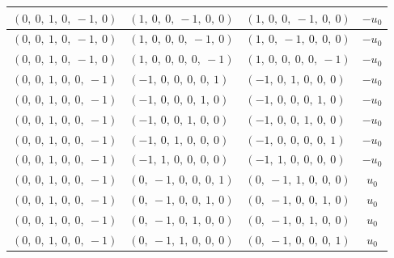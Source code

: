 \documentclass[11pt]{article}
\theoremstyle{definition}
\begin{document}
\begin{longtable}{|l|l|l|c|}
    \hline
    $\left( 0, \  0, \  1, \  0, \  -1, \  0\right)$ & $\left( 1, \  0, \  0, \  -1, \  0, \  0\right)$ & $\left( 1, \  0, \  0, \  -1, \  0, \  0\right)$ & $- u_{0}$ \\
    \hline
    $\left( 0, \  0, \  1, \  0, \  -1, \  0\right)$ & $\left( 1, \  0, \  0, \  0, \  -1, \  0\right)$ & $\left( 1, \  0, \  -1, \  0, \  0, \  0\right)$ & $- u_{0}$ \\
    \hline
    $\left( 0, \  0, \  1, \  0, \  -1, \  0\right)$ & $\left( 1, \  0, \  0, \  0, \  0, \  -1\right)$ & $\left( 1, \  0, \  0, \  0, \  0, \  -1\right)$ & $- u_{0}$ \\
    \hline
    $\left( 0, \  0, \  1, \  0, \  0, \  -1\right)$ & $\left( -1, \  0, \  0, \  0, \  0, \  1\right)$ & $\left( -1, \  0, \  1, \  0, \  0, \  0\right)$ & $- u_{0}$ \\
    \hline
    $\left( 0, \  0, \  1, \  0, \  0, \  -1\right)$ & $\left( -1, \  0, \  0, \  0, \  1, \  0\right)$ & $\left( -1, \  0, \  0, \  0, \  1, \  0\right)$ & $- u_{0}$ \\
    \hline
    $\left( 0, \  0, \  1, \  0, \  0, \  -1\right)$ & $\left( -1, \  0, \  0, \  1, \  0, \  0\right)$ & $\left( -1, \  0, \  0, \  1, \  0, \  0\right)$ & $- u_{0}$ \\
    \hline
    $\left( 0, \  0, \  1, \  0, \  0, \  -1\right)$ & $\left( -1, \  0, \  1, \  0, \  0, \  0\right)$ & $\left( -1, \  0, \  0, \  0, \  0, \  1\right)$ & $- u_{0}$ \\
    \hline
    $\left( 0, \  0, \  1, \  0, \  0, \  -1\right)$ & $\left( -1, \  1, \  0, \  0, \  0, \  0\right)$ & $\left( -1, \  1, \  0, \  0, \  0, \  0\right)$ & $- u_{0}$ \\
    \hline
    $\left( 0, \  0, \  1, \  0, \  0, \  -1\right)$ & $\left( 0, \  -1, \  0, \  0, \  0, \  1\right)$ & $\left( 0, \  -1, \  1, \  0, \  0, \  0\right)$ & $u_{0}$ \\
    \hline
    $\left( 0, \  0, \  1, \  0, \  0, \  -1\right)$ & $\left( 0, \  -1, \  0, \  0, \  1, \  0\right)$ & $\left( 0, \  -1, \  0, \  0, \  1, \  0\right)$ & $u_{0}$ \\
    \hline
    $\left( 0, \  0, \  1, \  0, \  0, \  -1\right)$ & $\left( 0, \  -1, \  0, \  1, \  0, \  0\right)$ & $\left( 0, \  -1, \  0, \  1, \  0, \  0\right)$ & $u_{0}$ \\
    \hline
    $\left( 0, \  0, \  1, \  0, \  0, \  -1\right)$ & $\left( 0, \  -1, \  1, \  0, \  0, \  0\right)$ & $\left( 0, \  -1, \  0, \  0, \  0, \  1\right)$ & $u_{0}$ \\

\end{longtable}
\end{document}
